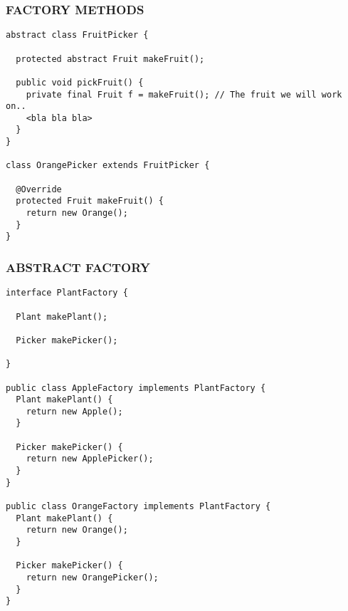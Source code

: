 \subsubsection{FACTORY METHODS}
\begin{lstlisting}
abstract class FruitPicker {

  protected abstract Fruit makeFruit();

  public void pickFruit() {
    private final Fruit f = makeFruit(); // The fruit we will work on..
    <bla bla bla>
  }
}

class OrangePicker extends FruitPicker {

  @Override
  protected Fruit makeFruit() {
    return new Orange();
  }
}
\end{lstlisting}
\subsubsection{ABSTRACT FACTORY}
\begin{lstlisting}
interface PlantFactory {

  Plant makePlant();

  Picker makePicker(); 

}

public class AppleFactory implements PlantFactory {
  Plant makePlant() {
    return new Apple();
  }

  Picker makePicker() {
    return new ApplePicker();
  }
}

public class OrangeFactory implements PlantFactory {
  Plant makePlant() {
    return new Orange();
  }

  Picker makePicker() {
    return new OrangePicker();
  }
}
\end{lstlisting}
